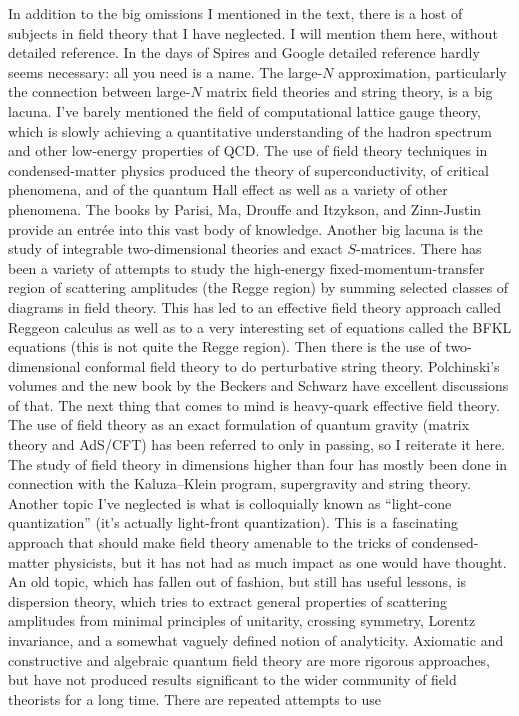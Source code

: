 
In addition to the big omissions I mentioned in the text, there is a host of
subjects in field theory that I have neglected. I will mention them here,
without detailed reference. In the days of Spires and Google detailed
reference hardly seems necessary: all you need is a name. The large-$N$
approximation, particularly the connection between large-$N$ matrix field
theories and string theory, is a big lacuna. I've barely mentioned the field
of computational lattice gauge theory, which is slowly achieving a quantitative
understanding of the hadron spectrum and other low-energy properties of QCD.
The use of field theory techniques in condensed-matter physics produced the
theory of superconductivity, of critical phenomena, and of the quantum Hall
effect as well as a variety of other phenomena. The books by Parisi, Ma,
Drouffe and Itzykson, and Zinn-Justin provide an entrée into this vast body of
knowledge. Another big lacuna is the study of integrable two-dimensional
theories and exact $S$-matrices. There has been a variety of attempts to study
the high-energy fixed-momentum-transfer region of scattering amplitudes (the
Regge region) by summing selected classes of diagrams in field theory. This has
led to an effective field theory approach called Reggeon calculus as well as to
a very interesting set of equations called the BFKL equations (this is not
quite the Regge region). Then there is the use of two-dimensional conformal
field theory to do perturbative string theory. Polchinski's volumes and the new
book by the Beckers and Schwarz have excellent discussions of that. The next
thing that comes to mind is heavy-quark effective field theory. The use of
field theory as an exact formulation of quantum gravity (matrix theory and
AdS/CFT) has been referred to only in passing, so I reiterate it here. The
study of field theory in dimensions higher than four has mostly been done in
connection with the Kaluza--Klein program, supergravity and string theory.
Another topic I've neglected is what is colloquially known as ``light-cone
quantization'' (it's actually light-front quantization). This is a fascinating
approach that should make field theory amenable to the tricks of condensed-
matter physicists, but it has not had as much impact as one would have thought.
An old topic, which has fallen out of fashion, but still has useful lessons, is
dispersion theory, which tries to extract general properties of scattering
amplitudes from minimal principles of unitarity, crossing symmetry, Lorentz
invariance, and a somewhat vaguely defined notion of analyticity. Axiomatic and
constructive and algebraic quantum field theory are more rigorous approaches,
but have not produced results significant to the wider community of field
theorists for a long time. There are repeated attempts to use

